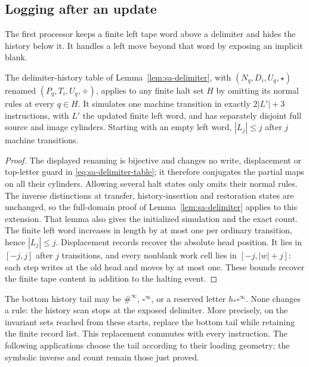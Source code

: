 \subsection{Logging after an update}
\label{subsec:sb-postlog}
The first processor keeps a finite left tape word above a delimiter and hides the history below it.  It handles a left move beyond that word by exposing an implicit blank.

\begin{lemma}\label{lem:sb-postlog}
The delimiter-history table of Lemma~\ref{lem:sa-delimiter}, with
$(N_q,D_i,U_q,\star)$ renamed $(P_q,T_i,U_q,\diamond)$, applies to any finite halt set $H$ by omitting its normal rules at every $q\in H$.  It simulates one machine transition in exactly $2|L'|+3$ instructions, with $L'$ the updated finite left word, and has separately disjoint full source and image cylinders.  Starting with an empty left word, $|L_j|\le j$ after $j$ machine transitions.
\end{lemma}
\begin{proof}
The displayed renaming is bijective and changes no write, displacement or
top-letter guard in \eqref{eq:sa-delimiter-table}; it therefore conjugates
the partial maps on all their cylinders. Allowing several halt states
only omits their normal rules. The inverse distinctions at transfer,
history-insertion and restoration states are unchanged, so the full-domain
proof of Lemma~\ref{lem:sa-delimiter} applies to this extension.
That lemma also gives the initialized simulation and the exact count.
The finite left word increases in length by at most one per ordinary
transition, hence $|L_j|\le j$. Displacement records recover the absolute
head position. It lies in $[-j,j]$ after $j$ transitions, and every
nonblank work cell lies in $[-j,|w|+j]$: each step writes at the old head
and moves by at most one. These bounds recover the finite tape content
in addition to the halting event.
\end{proof}

The bottom history tail may be $\#^\infty$, $\square^\infty$, or a
reserved letter $h_*\square^\infty$. None changes a rule: the history
scan stops at the exposed delimiter. More precisely, on the invariant
sets reached from these starts, replace the bottom tail while retaining
the finite record list. This replacement commutes with every instruction.
The following applications choose the tail according to their loading
geometry; the symbolic inverse and count remain those just proved.

